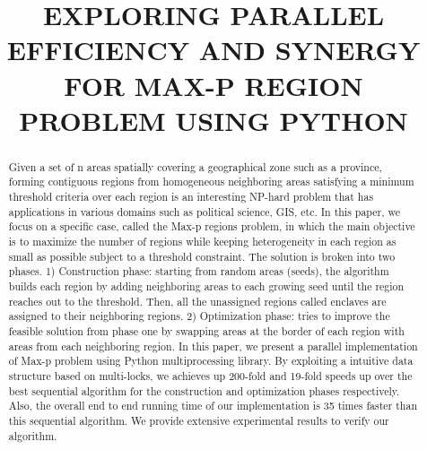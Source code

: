 \documentclass[conference]{IEEEtran}
\begin{document}
\title{EXPLORING PARALLEL EFFICIENCY AND SYNERGY FOR MAX-P REGION PROBLEM USING PYTHON\\
}

\author{
\and
{}
\and
{}
\and
{}
}

\maketitle

\begin{abstract}
Given a set of n areas spatially covering a geographical zone such as a
province, forming contiguous regions from homogeneous neighboring areas
satisfying a minimum threshold criteria over each region is an interesting
NP-hard problem that has applications in various domains such as political
science, GIS, etc. In this paper, we focus on a specific case, called the Max-p
regions problem, in which the main objective is to maximize the number of regions while
keeping heterogeneity in each region as small as possible subject to a threshold
constraint. The solution is
broken into two phases. 1) Construction phase: starting from random areas (seeds), the algorithm builds each region by adding neighboring areas to each
growing seed until the region reaches out to the threshold. Then, all the
unassigned regions called enclaves are assigned to their neighboring regions.
2) Optimization phase: tries to improve the feasible solution from phase one by swapping
areas at the border of each region with areas from each neighboring region. In this paper, we
present a parallel implementation of Max-p problem using Python multiprocessing
library. By exploiting a intuitive data structure based on multi-locks, we
achieves up 200-fold and 19-fold speeds up over the best sequential algorithm for
the construction and optimization phases respectively. Also, the overall end to
end running time of our implementation is 35 times faster than this sequential
algorithm. We provide extensive experimental results to verify our algorithm.
\end{abstract}
\end{document}
